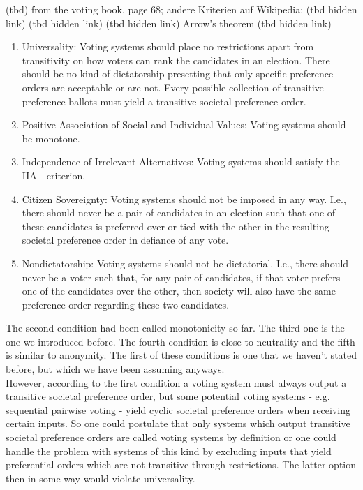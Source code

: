 (tbd)
	from the voting book, page 68; 
	andere Kriterien auf Wikipedia:  
	(tbd hidden link)%
	(tbd hidden link)%
	(tbd hidden link)%
Arrow's theorem	(tbd hidden link)%

\begin{enumerate} 
\item Universality: Voting systems should place no restrictions apart from transitivity on how voters can rank the candidates in an election. There should be no kind of dictatorship presetting that only specific preference orders are acceptable or are not. Every possible collection of transitive preference ballots must yield a transitive societal preference order. 
\item Positive Association of Social and Individual Values: Voting systems should be monotone. 
\item Independence of Irrelevant Alternatives: Voting systems should satisfy the IIA - criterion. 
\item Citizen Sovereignty: Voting systems should not be imposed in any way. I.e., there should never be a pair of candidates in an election such that one of these candidates is preferred over or tied with the other in the resulting societal preference order in defiance of any vote. 
\item Nondictatorship: Voting systems should not be dictatorial. I.e., there should never be a voter such that, for any pair of candidates, if that voter prefers one of the candidates over the other, then society will also have the same preference order regarding these two candidates. 
\end{enumerate} 
The second condition had been called monotonicity so far. The third one is the one we introduced before. The fourth condition is close to neutrality and the fifth is similar to anonymity. 
The first of these conditions is one that we haven't stated before, but which we have been assuming anyways. \\
However, according to the first condition a voting system must always output a transitive societal preference order, but some potential voting systems - e.g. sequential pairwise voting - yield cyclic societal preference orders when receiving certain inputs. So one could postulate that only systems which output transitive societal preference orders are called voting systems by definition or one could handle the problem with systems of this kind by excluding inputs that yield preferential orders which are not transitive through restrictions. The latter option then in some way would violate universality. \\
